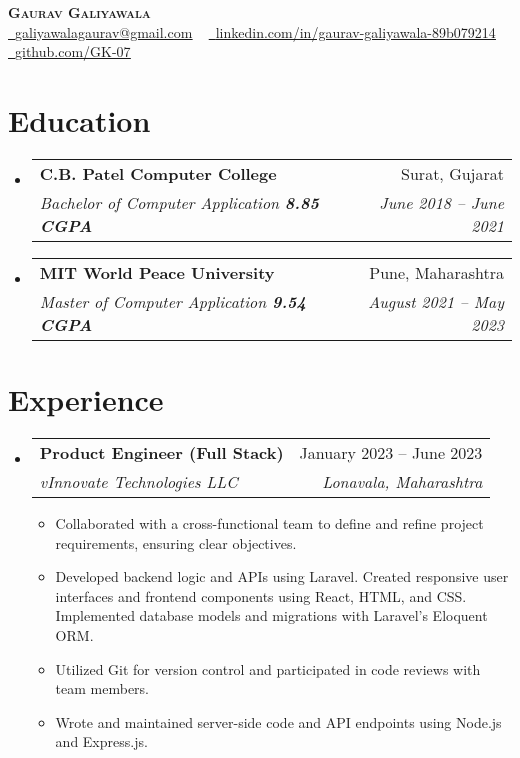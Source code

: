 \documentclass[letterpaper,11pt]{article}
\makeatletter
\newcommand{\resumeItem}[1]{
  \item\small{
    {#1 \vspace{-4pt}}
  }
}
\newcommand{\resumeSubheading}[4]{
  \vspace{-2pt}\item
    \begin{tabular*}{0.97\textwidth}[t]{l@{\extracolsep{\fill}}r}
      \textbf{#1} & #2 \\
      \textit{\small#3} & \textit{\small #4} \\
    \end{tabular*}\vspace{-7pt}
}
\newcommand{\resumeSubHeadingListStart}{\begin{itemize}[leftmargin=0.05in, label={}]}
\newcommand{\resumeSubHeadingListEnd}{\end{itemize}}
\newcommand{\resumeItemListStart}{\begin{itemize}\vspace{2pt}}
\newcommand{\resumeItemListEnd}{\end{itemize}\vspace{-5pt}}
\makeatother
\begin{document}

\begin{center}
    \textbf{\Huge \scshape Gaurav Galiyawala} \\ \vspace{1pt}
    \href{mailto:x@gmail.com}{\raisebox{-0.2\height}\faEnvelope\  \underline{galiyawalagaurav@gmail.com}} ~ 
    \href{https://linkedin.com/in//}{\raisebox{-0.2\height}\faLinkedin\ \underline{linkedin.com/in/gaurav-galiyawala-89b079214}}  ~
    \href{https://github.com/}{\raisebox{-0.2\height}\faGithub\ \underline{github.com/GK-07}}
    \vspace{-8pt}
\end{center}


\section{Education}
  \resumeSubHeadingListStart
    \resumeSubheading
       {C.B. Patel Computer College}{Surat, Gujarat}
      {Bachelor of Computer Application  \textbf{8.85 CGPA}}{June 2018 -- June 2021}
    \resumeSubheading
       {MIT World Peace University}{Pune, Maharashtra}
      {Master of Computer Application  \textbf{9.54 CGPA}}{August 2021 -- May 2023}
  \resumeSubHeadingListEnd


\section{Experience}
  \resumeSubHeadingListStart

    \resumeSubheading
      {Product Engineer (Full Stack)}{January 2023 -- June 2023}
      {vInnovate Technologies LLC}{Lonavala, Maharashtra}
      \resumeItemListStart
        \resumeItem{Collaborated with a cross-functional team to define and refine project requirements, ensuring clear objectives.}
        \resumeItem{Developed backend logic and APIs using Laravel. Created responsive user interfaces and frontend components using React, HTML, and CSS. Implemented database models and migrations with Laravel's Eloquent ORM.}
        \resumeItem{ Utilized Git for version control and participated in code reviews with team members.}
         \resumeItem{Wrote and maintained server-side code and API endpoints using Node.js and Express.js.}
      \resumeItemListEnd
    \resumeSubHeadingListEnd
      
\end{document}
